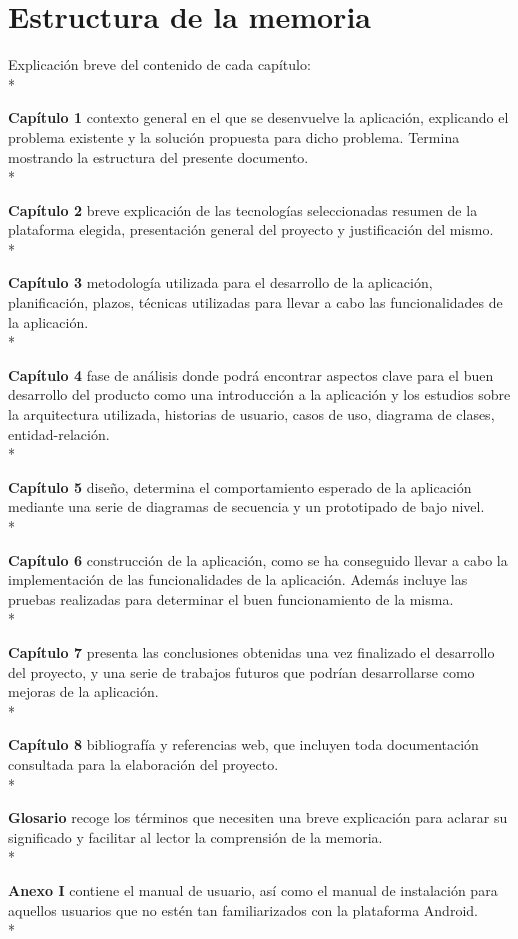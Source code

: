 \documentclass[../pfc.tex]{subfiles}
\begin{document}
\section{Estructura de la memoria}

Explicación breve del contenido de cada capítulo:\\*

  \textbf{Capítulo 1} contexto general en el que se desenvuelve la aplicación, explicando el problema existente y la solución propuesta para dicho problema. Termina mostrando la estructura del presente documento.\\*
  
  \textbf{Capítulo 2} breve explicación de las tecnologías seleccionadas resumen de la plataforma elegida, presentación general del proyecto y justificación del mismo.\\*
  
  \textbf{Capítulo 3} metodología utilizada para el desarrollo de la aplicación, planificación, plazos, técnicas utilizadas para llevar a cabo las funcionalidades de la aplicación.\\*
  
  \textbf{Capítulo 4} fase de análisis donde podrá encontrar aspectos clave para el buen desarrollo del producto como una introducción a la aplicación y los estudios sobre la arquitectura utilizada, historias de usuario, casos de uso, diagrama de clases, entidad-relación.\\*
  
  \textbf{Capítulo 5} diseño, determina el comportamiento esperado de la aplicación mediante una serie de diagramas de secuencia y un prototipado de bajo nivel.\\*
  
  \textbf{Capítulo 6} construcción de la aplicación, como se ha conseguido llevar a cabo la implementación de las funcionalidades de la aplicación. Además incluye las pruebas realizadas para determinar el buen funcionamiento de la misma.\\*
  
  \textbf{Capítulo 7} presenta las conclusiones obtenidas una vez finalizado el desarrollo del proyecto, y una serie de trabajos futuros que podrían desarrollarse como mejoras de la aplicación.\\*
  
  \textbf{Capítulo 8} bibliografía y referencias web, que incluyen toda documentación consultada para la elaboración del proyecto.\\* 
  
  \textbf{Glosario} recoge los términos que necesiten una breve explicación para aclarar su significado y facilitar al lector la comprensión de la memoria.\\* 
  
  \textbf{Anexo I} contiene el manual de usuario, así como el manual de instalación para aquellos usuarios que no estén tan familiarizados con la plataforma Android.\\*

 
\end{document}
